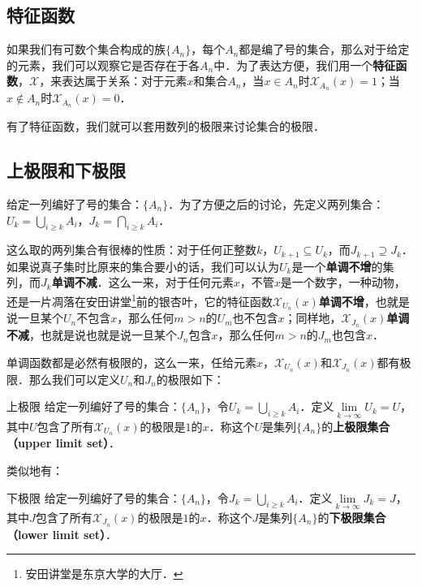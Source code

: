 
\subsection{特征函数}
如果我们有可数个集合构成的族$\{A_n\}$，每个$A_n$都是编了号的集合，那么对于给定的元素，我们可以观察它是否存在于各$A_n$中．为了表达方便，我们用一个\textbf{特征函数}，$\mathcal{X}$，来表达属于关系：对于元素$x$和集合$A_n$，当$x\in A_n$时$\mathcal{X}_{A_n}(x)=1$；当$x\not\in A_n$时$\mathcal{X}_{A_n}(x)=0$．

有了特征函数，我们就可以套用数列的极限来讨论集合的极限．

\subsection{上极限和下极限}
给定一列编好了号的集合：$\{A_n\}$．为了方便之后的讨论，先定义两列集合：$U_k=\bigcup_{i\ge k}A_i$，$J_k=\bigcap_{i\ge k}A_i$．

这么取的两列集合有很棒的性质：对于任何正整数$k$，$U_{k+1}\subseteq U_k$，而$J_{k+1}\supseteq J_k$．如果说真子集时比原来的集合要小的话，我们可以认为$U_k$是一个\textbf{单调不增}的集列，而$J_k$\textbf{单调不减}．这么一来，对于任何元素$x$，不管$x$是一个数字，一种动物，还是一片凋落在安田讲堂\footnote{安田讲堂是东京大学的大厅．}前的银杏叶，它的特征函数$\mathcal{X}_{U_n}(x)$\textbf{单调不增}，也就是说一旦某个$U_n$不包含$x$，那么任何$m>n$的$U_m$也不包含$x$；同样地，$\mathcal{X}_{J_n}(x)$\textbf{单调不减}，也就是说也就是说一旦某个$J_n$包含$x$，那么任何$m>n$的$J_m$也包含$x$．

单调函数都是必然有极限的，这么一来，任给元素$x$，$\mathcal{X}_{U_n}(x)$和$\mathcal{X}_{J_n}(x)$都有极限．那么我们可以定义$U_n$和$J_n$的极限如下：

\begin{definition}{上极限}
给定一列编好了号的集合：$\{A_n\}$，令$U_k=\bigcup_{i\ge k}A_i$．定义$\lim\limits_{k\rightarrow\infty} U_k=U$，其中$U$包含了所有$\mathcal{X}_{U_n}(x)$的极限是$1$的$x$．称这个$U$是集列$\{A_n\}$的\textbf{上极限集合（upper limit set）}．
\end{definition}

类似地有：

\begin{definition}{下极限}
给定一列编好了号的集合：$\{A_n\}$，令$J_k=\bigcup_{i\ge k}A_i$．定义$\lim\limits_{k\rightarrow\infty} J_k=J$，其中$J$包含了所有$\mathcal{X}_{J_n}(x)$的极限是$1$的$x$．称这个$J$是集列$\{A_n\}$的\textbf{下极限集合（lower limit set）}．
\end{definition}

